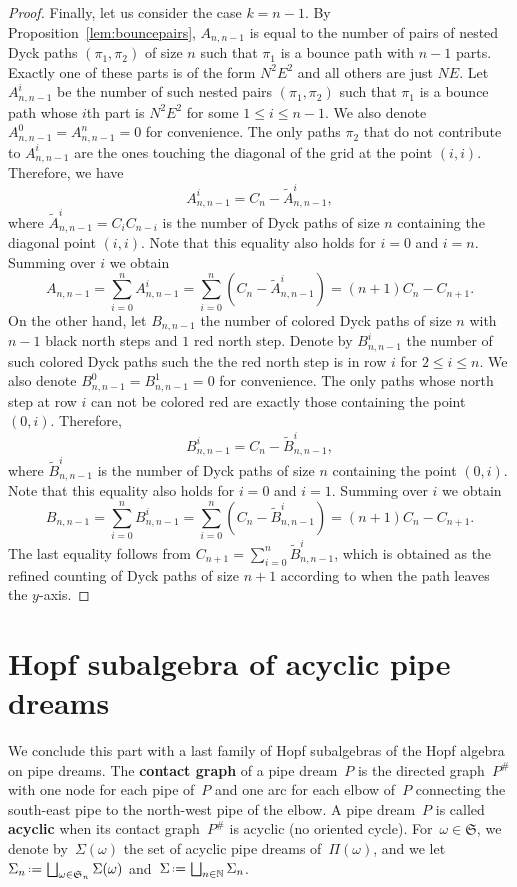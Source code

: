 \documentclass{amsart}
\theoremstyle{definition}
\newcommand{\N}{\mathbb{N}} %
\newcommand{\eqdef}{\mbox{\,\raisebox{0.2ex}{\scriptsize\ensuremath{\mathrm:}}\ensuremath{=}\,}} %
\newcommand{\defn}[1]{\textbf{\textsf{\color{PineGreen} #1}}} %
\newcommand{\fS}{\mathfrak{S}} %
\newcommand{\pipeDreams}{\Pi} %
\newcommand{\contact}{^\#} %
\newcommand{\acyclicPipeDreams}{\Sigma} %
\begin{document}
\begin{proof}
Finally, let us consider the case $k=n-1$. By Proposition~\ref{lem:bouncepairs}, $A_{n,n-1}$ is equal to the number of pairs of nested Dyck paths $(\pi_1,\pi_2)$ of size $n$ such that $\pi_1$ is a bounce path with $n-1$ parts. Exactly one of these parts is of the form $N^2E^2$ and all others are just $NE$.
Let $A_{n,n-1}^i$ be the number of such nested pairs $(\pi_1,\pi_2)$ such that $\pi_1$ is a bounce path whose $i$th part is $N^2E^2$ for some $1\leq i \leq n-1$.
We also denote $A_{n,n-1}^0=A_{n,n-1}^n=0$ for convenience. The only paths $\pi_2$ that do not contribute to $A_{n,n-1}^i$ are the ones touching the diagonal of the grid at the point $(i,i)$. Therefore, we have
\[
A_{n,n-1}^i = C_n - \tilde A_{n,n-1}^i,
\]
where $\tilde A_{n,n-1}^i=C_i C_{n-i}$ is the number of Dyck paths of size $n$ containing the diagonal point $(i,i)$. 
Note that this equality also holds for $i=0$ and $i=n$.
Summing over $i$ we obtain
\[
A_{n,n-1} = \sum_{i=0}^{n} A_{n,n-1}^i = 
\sum_{i=0}^{n} (C_n - \tilde A_{n,n-1}^i) = 
(n+1)C_n - C_{n+1}. 
\]
On the other hand, let $B_{n,n-1}$ the number of colored Dyck paths of size $n$ with $n-1$ black north steps and $1$ red north step. 
Denote by $B_{n,n-1}^i$ the number of such colored Dyck paths such the the red north step is in row $i$ for $2\leq i\leq n$. 
We also denote $B_{n,n-1}^0=B_{n,n-1}^1=0$ for convenience.
The only paths whose north step at row $i$ can not be colored red are exactly those containing the point $(0,i)$. Therefore,
\[
B_{n,n-1}^i = C_n - \tilde B_{n,n-1}^i,
\]
where $\tilde B_{n,n-1}^i$ is the number of Dyck paths of size $n$ containing the point $(0,i)$. 
Note that this equality also holds for $i=0$ and $i=1$.
Summing over $i$ we obtain
\[
B_{n,n-1} = \sum_{i=0}^{n} B_{n,n-1}^i = 
\sum_{i=0}^{n} (C_n - \tilde B_{n,n-1}^i) = 
(n+1)C_n - C_{n+1}. 
\]
The last equality follows from $C_{n+1}=\sum_{i=0}^{n} \tilde B_{n,n-1}^i$, which is obtained as the refined counting of Dyck paths of size $n+1$ according 
to when the path leaves the $y$-axis. 
\end{proof}
 

\section{Hopf subalgebra of acyclic pipe dreams}
\label{sec:acyclicPipeDreams}

We conclude this part with a last family of Hopf subalgebras of the Hopf algebra on pipe dreams.
The \defn{contact graph} of a pipe dream~$P$ is the directed graph~$P\contact$ with one node for each pipe of~$P$ 
and one arc for each elbow of~$P$ connecting the south-east pipe to the north-west pipe of the elbow. 
A pipe dream~$P$ is called \defn{acyclic} when its contact graph~$P\contact$ is acyclic (no oriented cycle). 
For~$\omega \in \fS$, we denote by~$\acyclicPipeDreams(\omega)$ the set of acyclic pipe dreams of~$\pipeDreams(\omega)$, and we let~$\acyclicPipeDreams_n \eqdef \bigsqcup_{\omega \in \fS_n} \acyclicPipeDreams(\omega)$ and~$\acyclicPipeDreams \eqdef \bigsqcup_{n \in \N} \acyclicPipeDreams_n$.
\end{document}
